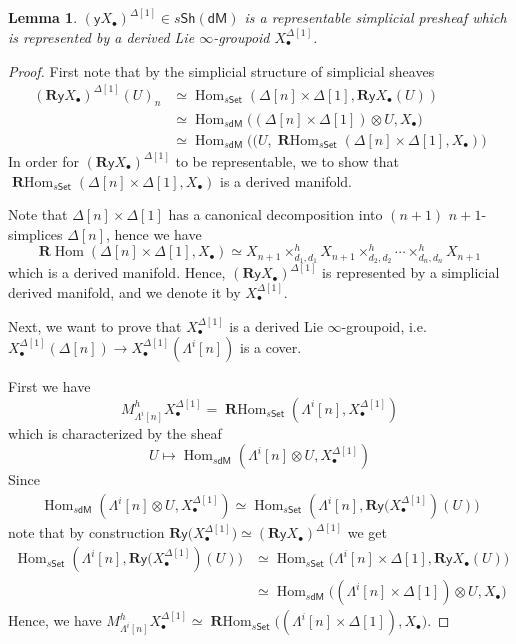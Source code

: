 \documentclass[12pt]{amsart}
\newtheorem{lem}[thm]{Lemma}
\theoremstyle{definition}
\theoremstyle{remark}
\numberwithin{equation}{section}
\newcommand{\BR}{{\mathbf R}}
\newcommand{\1}{{\mathbb{1}}}
\newcommand{\y}{\mathsf{y}}
\newcommand{\set}{\mathsf{Set}}
\newcommand{\dm}{\mathsf{dM}}
\newcommand{\sh}{\mathsf{Sh}}
\newcommand{\Hom}{\operatorname{Hom}}
\newcommand{\rhom}{\operatorname{\mathbf{R}Hom}}
\begin{document}
\begin{lem}
	 $(\y X_{\bullet})^{\Delta[1]}\in s\sh(\dm)$ is a representable simplicial presheaf which is represented by a derived Lie $\infty$-groupoid $X^{\Delta[1]}_{\bullet}$.
\end{lem}
\begin{proof}First note that by the simplicial structure of simplicial sheaves
	\begin{align*}
	(\mathbf{R}\y X_{\bullet})^{\Delta[1]} (U)_n&\simeq\Hom_{s\set}(\Delta[n]\times \Delta[1], \BR \y X_{\bullet}(U) )\\
	&\simeq \Hom_{s\dm}\big((\Delta[n]\times \Delta[1])\otimes U, X_{\bullet} \big)\\
	&\simeq \Hom_{s\dm}\big((U, \rhom_{s\set} (\Delta[n]\times \Delta[1],X_{\bullet} )\big)
	\end{align*}
	In order for $(\BR\y X_{\bullet})^{\Delta[1]}$ to be representable, we to show that $\rhom_{s\set} (\Delta[n]\times \Delta[1],X_{\bullet} )$ is a derived manifold.
	
	Note that $\Delta[n]\times \Delta[1]$ has a canonical decomposition into $(n+1)$ $n+1$-simplices $\Delta[n]$, hence we have 
	$$  \BR\Hom (\Delta[n]\times \Delta[1],X_{\bullet} ) \simeq X_{n+1}   \times_{d_1,d_1}^h X_{n+1}\times_{d_2,d_2}^h\cdots \times_{d_n,d_n}^h X_{n+1}$$ which is a derived manifold. Hence, $(\BR \y X_{\bullet})^{\Delta[1]}$ is represented by a simplicial derived manifold,  and we denote it by $X_{\bullet}^{\Delta[1]}$.
	
	Next, we want to prove that $X_{\bullet}^{\Delta[1]}$ is a derived Lie $\infty$-groupoid, i.e. $X_{\bullet}^{\Delta[1]}(\Delta[n]) \to  X_{\bullet}^{\Delta[1]}(\Lambda^i[n])$ is a cover.
	
	First we have 
	$$M^h_{\Lambda^i[n]} X_{\bullet}^{\Delta[1]}=\rhom_{s\set}(\Lambda^i[n], X_{\bullet}^{\Delta[1]}) $$
	which is characterized by the sheaf $$U\mapsto \Hom_{s\dm}(\Lambda^i[n] \otimes U, X_{\bullet}^{\Delta[1]}) $$
	Since
	\begin{align*}
	\Hom_{s\dm}(\Lambda^i[n] \otimes U, X_{\bullet}^{\Delta[1]}) \simeq \Hom_{s\set} (\Lambda^i[n], \BR \y\big(X_{\bullet}^{\Delta[1]})(U)  \big)
	\end{align*}
	note that by construction  $\BR \y\big(X_{\bullet}^{\Delta[1]})\simeq (\BR \y X_{\bullet})^{\Delta[1]}$
	we get 
	\begin{align*}\Hom_{s\set} (\Lambda^i[n], \BR\y\big(X_{\bullet}^{\Delta[1]})(U)  \big) &\simeq \Hom_{s\set} \big(\Lambda^i[n]\times \Delta[1], \BR\y X_{\bullet}(U) \big) \\
	&\simeq \Hom_{s\dm} \big((\Lambda^i[n]\times \Delta[1])\otimes U, X_{\bullet} \big) 
	\end{align*}
	Hence, we have $M^h_{\Lambda^i[n]} X_{\bullet}^{\Delta[1]}\simeq \rhom_{s\set} \big((\Lambda^i[n]\times \Delta[1]),  X_{\bullet}\big)$.
	

\end{proof}
\end{document}
